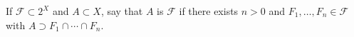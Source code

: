 If $\mathcal{F} \subset 2^X$ and $A \subset X$, say that $A$ is  $\mathcal{F}$ if there exists $n > 0$ and $F_1, \ldots, F_n \in \mathcal{F}$ with $A \supset F_1 \cap \cdots \cap F_n$.
